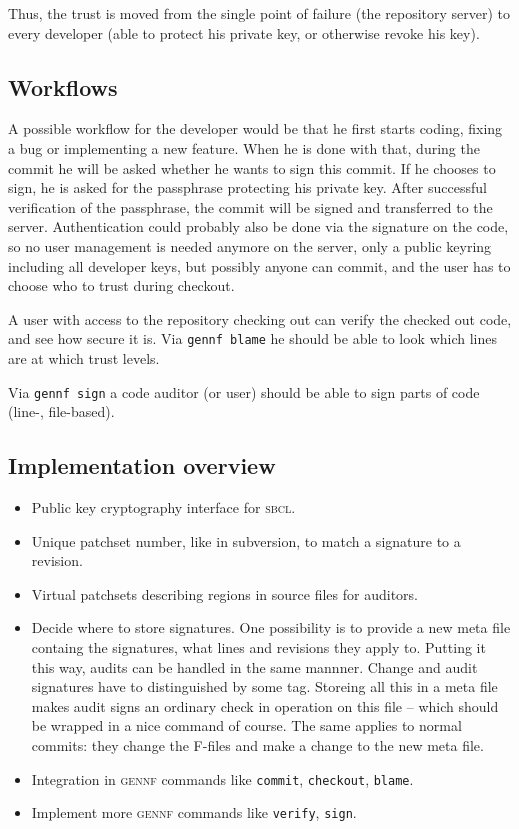 \documentclass[fleqn, 10pt, a4paper]{report} \usepackage{amssymb}
\begin{document}
Thus, the trust is moved from the single point of failure (the
repository server) to every developer (able to protect his private
key, or otherwise revoke his key).


\subsection{Workflows}

A possible workflow for the developer would be that he first starts
coding, fixing a bug or implementing a new feature. When he is done
with that, during the commit he will be asked whether he wants to sign
this commit.  If he chooses to sign, he is asked for the passphrase
protecting his private key. After successful verification of the
passphrase, the commit will be signed and transferred to the server.
Authentication could probably also be done via the signature on the
code, so no user management is needed anymore on the server, only a
public keyring including all developer keys, but possibly anyone can
commit, and the user has to choose who to trust during checkout.

A user with access to the repository checking out can verify the
checked out code, and see how secure it is. Via \texttt{gennf blame}
he should be able to look which lines are at which trust levels.

Via \texttt{gennf sign} a code auditor (or user) should be able to
sign parts of code (line-, file-based).


\subsection{Implementation overview}

\begin{itemize}
\item Public key cryptography interface for \textsc{sbcl}.
\item Unique patchset number, like in subversion, to match a signature
  to a revision.
\item Virtual patchsets describing regions in source files for
  auditors.
\item Decide where to store signatures. One possibility is to provide a
  new meta file containg the signatures, what lines and revisions they
  apply to. Putting it this way, audits can be handled in the same
  mannner. Change and audit signatures have to distinguished by some
  tag. Storeing all this in a meta file makes audit signs an ordinary
  check in operation on this file -- which should be wrapped in a nice
  command of course. The same applies to normal commits: they change
  the F-files and make a change to the new meta file.
\item Integration in \textsc{gennf} commands like \texttt{commit},
  \texttt{checkout}, \texttt{blame}.
\item Implement more \textsc{gennf} commands like \texttt{verify},
  \texttt{sign}.
\end{itemize}
\end{document}
